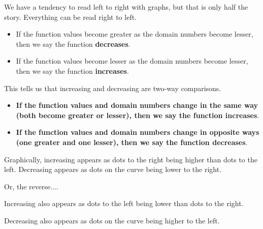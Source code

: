 \documentclass{ximera}
\begin{document}
\begin{warning}
We have a tendency to read left to right with graphs, but that is only half the story.  Everything can be read right to left. 


\begin{itemize}
    \item If the function values become greater as the domain numbers become lesser, then we say the function \textbf{decreases}.  
    \item If the function values become lesser as the domain numbers become lesser, then we say the function \textbf{increases}.  
\end{itemize}


This tells us that increasing and decreasing are two-way comparisons.

\begin{itemize}
    \item \textbf{\textcolor{purple!85!blue}{If the function values and domain numbers change in the same way (both become greater or lesser), then we say the function \textbf{increases}}}.  
    \item \textbf{\textcolor{purple!85!blue}{If the function values and domain numbers change in opposite ways (one greater and one lesser), then we say the function \textbf{decreases}}}. 
\end{itemize}






\end{warning}















Graphically, increasing appears as dots to the right being higher than dots to the left.  Decreasing appears as dots on the curve being lower to the right. 


Or, the reverse....


Increasing also appears as dots to the left being lower than dots to the right.  

Decreasing also appears as dots on the curve being higher to the left. 
\end{document}

